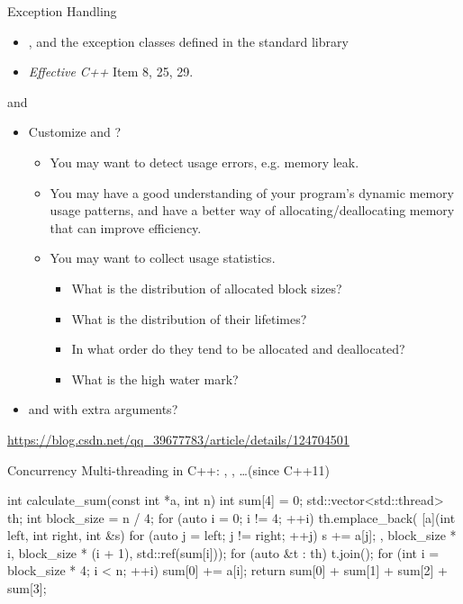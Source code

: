 \begin{frame}{Exception Handling}
    \begin{itemize}
        \item {},  and the exception classes defined in the standard library
        \item \textit{Effective C++} Item 8, 25, 29.
    \end{itemize}
\end{frame}

\begin{frame}{ and }
    \begin{itemize}
        \item Customize  and ?
        \begin{itemize}
            \item You may want to detect usage errors, e.g. memory leak.
            \item You may have a good understanding of your program's dynamic memory usage patterns, and have a better way of allocating/deallocating memory that can improve efficiency.
            \item You may want to collect usage statistics.
            \begin{itemize}
                \item What is the distribution of allocated block sizes?
                \item What is the distribution of their lifetimes?
                \item In what order do they tend to be allocated and deallocated?
                \item What is the high water mark?
            \end{itemize}
        \end{itemize}
        \item {} and  with extra arguments?
    \end{itemize}
    \url{https://blog.csdn.net/qq_39677783/article/details/124704501}
\end{frame}

\begin{frame}[fragile]{Concurrency}
    Multi-threading in C++: , , \dots (since C++11)
    \begin{cpp}
int calculate_sum(const int *a, int n) {
  int sum[4] = {0};
  std::vector<std::thread> th;
  int block_size = n / 4;
  for (auto i = 0; i != 4; ++i)
    th.emplace_back(
        [a](int left, int right, int &s) {
          for (auto j = left; j != right; ++j)
            s += a[j];
        }, block_size * i, block_size * (i + 1),
            std::ref(sum[i]));
  for (auto &t : th) t.join();
  for (int i = block_size * 4; i < n; ++i)
    sum[0] += a[i];
  return sum[0] + sum[1] + sum[2] + sum[3];
}
    \end{cpp}
\end{frame}

